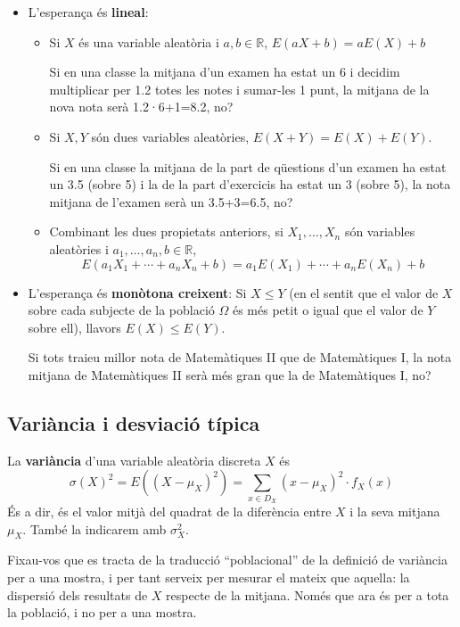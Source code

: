 \documentclass[
]{book}
\renewcommand{\leq}{\leqslant}
\theoremstyle{definition}
\theoremstyle{definition}
\theoremstyle{definition}
\theoremstyle{remark}
\begin{document}
\begin{itemize}
\item
  L'esperança és \textbf{lineal}:

  \begin{itemize}
  \item
    Si \(X\) és una variable aleatòria i \(a,b\in \mathbb{R}\), \(E(aX+b)=aE(X)+b\)

    Si en una classe la mitjana d'un examen ha estat un 6 i decidim multiplicar per 1.2 totes les notes i sumar-les 1 punt, la mitjana de la nova nota serà 1.2·6+1=8.2, no?
  \item
    Si \(X,Y\) són dues variables aleatòries, \(E(X+Y)=E(X)+E(Y)\).

    Si en una classe la mitjana de la part de qüestions d'un examen ha estat un 3.5 (sobre 5) i la de la part d'exercicis ha estat un 3 (sobre 5), la nota mitjana de l'examen serà un 3.5+3=6.5, no?
  \item
    Combinant les dues propietats anteriors, si \(X_1,\ldots,X_n\) són variables aleatòries i \(a_1,\ldots,a_n,b\in \mathbb{R}\),
    \[
      E(a_1X_1+\cdots+a_nX_n+b)=a_1E(X_1)+\cdots+a_nE(X_n)+b
      \]
  \end{itemize}
\item
  L'esperança és \textbf{monòtona creixent}: Si \(X\leq Y\) (en el sentit que el valor de \(X\) sobre cada subjecte de la població \(\Omega\) és més petit o igual que el valor de \(Y\) sobre ell), llavors \(E(X)\leq E(Y)\).

  Si tots traieu millor nota de Matemàtiques II que de Matemàtiques I, la nota mitjana de Matemàtiques II serà més gran que la de Matemàtiques I, no?
\end{itemize}

\hypertarget{variuxe0ncia-i-desviaciuxf3-tuxedpica}{%
\subsection{Variància i desviació típica}\label{variuxe0ncia-i-desviaciuxf3-tuxedpica}}

La \textbf{variància} d'una variable aleatòria discreta \(X\) és
\[
\sigma(X)^2 =E((X-\mu_X)^2) =\sum_{x\in D_X} (x-\mu_X)^2\cdot f_X(x)
\]
És a dir, és el valor mitjà del quadrat de la diferència entre \(X\) i la seva mitjana \(\mu_X\). També la indicarem amb \(\sigma_X^2\).

Fixau-vos que es tracta de la traducció ``poblacional'' de la definició de variància per a una mostra, i per tant serveix per mesurar el mateix que aquella: la dispersió dels resultats de \(X\) respecte de la mitjana. Només que ara és per a tota la població, i no per a una mostra.
\end{document}
